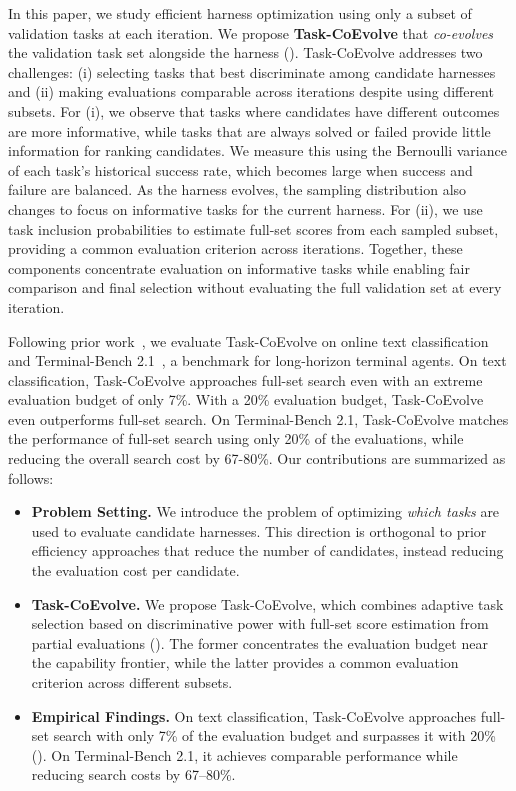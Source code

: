 \documentclass{article} %
\begin{document}
In this paper, we study efficient harness optimization using only a subset of validation tasks at each iteration. We propose \textbf{Task-CoEvolve} that \emph{co-evolves} the validation task set alongside the harness (). Task-CoEvolve addresses two challenges: (i) selecting tasks that best discriminate among candidate harnesses and (ii) making evaluations comparable across iterations despite using different subsets.
For (i), we observe that tasks where candidates have different outcomes are more informative, while tasks that are always solved or failed provide little information for ranking candidates. We measure this using the Bernoulli variance of each task's historical success rate, which becomes large when success and failure are balanced. As the harness evolves, the sampling distribution also changes to focus on informative tasks for the current harness. For (ii), we use task inclusion probabilities to estimate full-set scores from each sampled subset, providing a common evaluation criterion across iterations. Together, these components concentrate evaluation on informative tasks while enabling fair comparison and final selection without evaluating the full validation set at every iteration.




Following prior work~\citep{lee2026meta}, we evaluate Task-CoEvolve on online text classification~\citep{fei2024lawbench, gretel2023symptom, schneider2016s} and Terminal-Bench 2.1~\citep{merrill2026terminal}, a benchmark for long-horizon terminal agents. On text classification, Task-CoEvolve approaches full-set search even with an extreme evaluation budget of only 7\%. With a 20\% evaluation budget, Task-CoEvolve even outperforms full-set search. On Terminal-Bench 2.1, Task-CoEvolve matches the performance of full-set search using only 20\% of the evaluations, while reducing the overall search cost by 67-80\%.
Our contributions are summarized as follows:
\begin{itemize}
\item \textbf{Problem Setting.} We introduce the problem of optimizing \emph{which tasks} are used to evaluate candidate harnesses. This direction is orthogonal to prior efficiency approaches that reduce the number of candidates, instead reducing the evaluation cost per candidate.

\item \textbf{Task-CoEvolve.} We propose Task-CoEvolve, which combines adaptive task selection based on discriminative power with full-set score estimation from partial evaluations (). The former concentrates the evaluation budget near the capability frontier, while the latter provides a common evaluation criterion across different subsets.

\item \textbf{Empirical Findings.} On text classification, Task-CoEvolve approaches full-set search with only 7\% of the evaluation budget and surpasses it with 20\% (). On Terminal-Bench 2.1, it achieves comparable performance while reducing search costs by 67--80\%.


\end{itemize}
\end{document}
